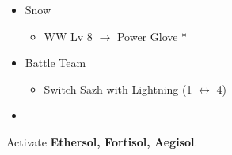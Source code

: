 \begin{multicols}{2}
\begin{menu}
\begin{itemize}
\begin{itemize}
        \item Snow
        \begin{itemize}
            \item WW Lv 8 $\rightarrow$ Power Glove *
        \end{itemize}
    \end{itemize}
    \paradigm
    \begin{itemize}
        \item Battle Team
        \begin{itemize}
            \item Switch Sazh with Lightning (1 $\leftrightarrow$ 4)
        \end{itemize}
        \item {}%
{\paradigmline{\com}{\sen}{\med}}%
{\paradigmline{(\rav)}{\rav}{\rav}}%
{\paradigmline{(\rav)}{\sen}{(\rav)}}%
{\paradigmline[4]{\textit{(\com)}}{\textit{\com}}{\textit{(\com)}}}%
{\paradigmline{\rav}{\com}{(\com)}}%
{\paradigmline{\rav}{\com}{(\rav)}}
    \end{itemize}
\end{itemize}
\end{menu}
\end{multicols}
\newpage
Activate \textbf{Ethersol, Fortisol, Aegisol}.
\renewcommand{\first}{[1]/[5] Aggression (\rav/\com/\com)}
\renewcommand{\second}{[2]/[4] Cerberus (\com/\com/\com)}
\renewcommand{\third}{[3]/[3] Mystic Tower (\rav/\sen/\rav)}
\renewcommand{\fourth}{[4]/[1] Solidarity (\com/\sen/\med)}
\renewcommand{\fifth}{[5]/[6] Relentless Assault (\rav/\com/\rav)}
\renewcommand{\sixth}{[6]/[2] Tri-Disaster (\rav/\rav/\rav)}
